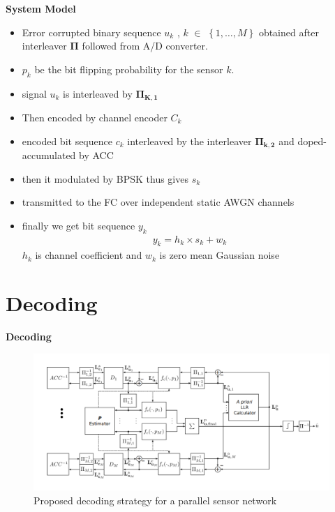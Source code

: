 \documentclass{beamer}
\providecommand{\cbrak}[1]{\ensuremath{\left\{#1\right\}}}
\begin{document}
\begin{frame}{\textbf{System Model}}
    \begin{itemize}
        \item Error corrupted binary sequence $u_k$ , $k$ $\in$ \cbrak{1,\dots,M} obtained after interleaver $\mathbf{\Pi}$ followed from A/D converter.
        \item $p_k$ be the bit flipping probability for the sensor $k$.
        \item signal $u_k$ is interleaved by $\mathbf{\Pi_{\text{K},1}}$ 
        \item Then encoded by channel encoder $C_k$ 
        \item encoded bit sequence $c_k$ interleaved by the interleaver $\mathbf{\Pi_{\text{k},2}}$ and doped-accumulated by ACC
        \item then it modulated by BPSK thus gives $s_k$
        \item transmitted to the FC over independent static AWGN channels
        \item finally we get bit sequence $y_k$
        \begin{align}
            y_k=h_k\times s_k + w_k 
        \end{align}
        $h_k$ is channel coefficient  and  $w_k$ is zero mean Gaussian noise
    \end{itemize}
\end{frame}

\section{Decoding}
\begin{frame}{\textbf{Decoding}}
    \begin{figure}
        \centering
        \includegraphics[scale=0.4]{figures/Decoder.png}
        \caption{ Proposed decoding strategy for a parallel sensor network}
        \label{fig:decoding}
    \end{figure}
\end{frame}
\end{document}
